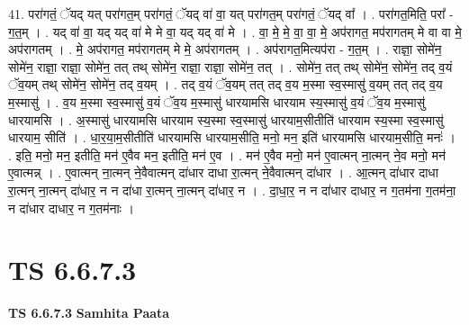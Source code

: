 \documentclass[17pt]{extarticle}
\begin{document}
41. परा॑गतं॒ ॅयद् यत् परा॑गत॒म् परा॑गतं॒ ॅयद् वा॑ वा॒ यत् परा॑गत॒म् परा॑गतं॒ ॅयद् वा᳚ । . परा॑गत॒मिति॒ परा᳚ - ग॒त॒म् । . यद् वा॑ वा॒ यद् यद् वा॑ मे मे वा॒ यद् यद् वा॑ मे । . वा॒ मे॒ मे॒ वा॒ वा॒ मे॒ अप॑रागत॒ मप॑रागतम् मे वा वा मे॒ अप॑रागतम् । . मे॒ अप॑रागत॒ मप॑रागतम् मे मे॒ अप॑रागतम् । . अप॑रागत॒मित्यप॑रा - ग॒त॒म् । . राज्ञा॒ सोमे॑न॒ सोमे॑न॒ राज्ञा॒ राज्ञा॒ सोमे॑न॒ तत् तथ् सोमे॑न॒ राज्ञा॒ राज्ञा॒ सोमे॑न॒ तत् । . सोमे॑न॒ तत् तथ् सोमे॑न॒ सोमे॑न॒ तद् व॒यं ॅव॒यम् तथ् सोमे॑न॒ सोमे॑न॒ तद् व॒यम् । . तद् व॒यं ॅव॒यम् तत् तद् व॒य म॒स्मा स्व॒स्मासु॑ व॒यम् तत् तद् व॒य म॒स्मासु॑ । . व॒य म॒स्मा स्व॒स्मासु॑ व॒यं ॅव॒य म॒स्मासु॑ धारयामसि धारयाम स्य॒स्मासु॑ व॒यं ॅव॒य म॒स्मासु॑ धारयामसि । . अ॒स्मासु॑ धारयामसि धारयाम स्य॒स्मा स्व॒स्मासु॑ धारयाम॒सीतीति॑ धारयाम स्य॒स्मा स्व॒स्मासु॑ धारयाम॒ सीति॑ । . धा॒र॒या॒म॒सीतीति॑ धारयामसि धारयाम॒सीति॒ मनो॒ मन॒ इति॑ धारयामसि धारयाम॒सीति॒ मनः॑ । . इति॒ मनो॒ मन॒ इतीति॒ मन॑ ए॒वैव मन॒ इतीति॒ मन॑ ए॒व । . मन॑ ए॒वैव मनो॒ मन॑ ए॒वात्मन् ना॒त्मन् ने॒व मनो॒ मन॑ ए॒वात्मन्न् । . ए॒वात्मन् ना॒त्मन् ने॒वैवात्मन् दा॑धार दाधा रा॒त्मन् ने॒वैवात्मन् दा॑धार । . आ॒त्मन् दा॑धार दाधा रा॒त्मन् ना॒त्मन् दा॑धार॒ न न दा॑धा रा॒त्मन् ना॒त्मन् दा॑धार॒ न । . दा॒धा॒र॒ न न दा॑धार दाधार॒ न ग॒तम॑ना ग॒तम॑ना॒ न दा॑धार दाधार॒ न ग॒तम॑नाः । \newline
\pagebreak
{}

\section{ TS 6.6.7.3 }

\textbf{TS 6.6.7.3 } \newline
\textbf{Samhita Paata} \newline
\end{document}
